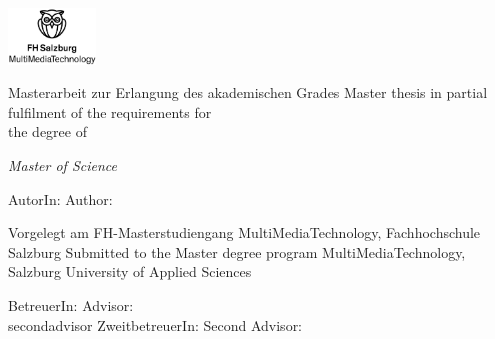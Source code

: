 \begin{titlepage}

\newcommand{\printsecondadvisor}[1]{%
  \ifcsname#1\endcsname%
  \ifmmtlanguagegerman ZweitbetreuerIn: \else Second Advisor: \fi \secondadvisor 
  \else%
    
  \fi%
}

\ifmmtmasterthesis

    
    
    \newpage
    
    \thispagestyle{empty}
    
    \hfill \includegraphics[height=1.5cm]{images/FHSLogo.jpg}
    
    \vspace*{2cm}
    
    \Large{
    \titlename
    
    \vspace*{1cm}
    
    \ifmmtlanguagegerman
    Masterarbeit zur Erlangung des akademischen Grades
    \else
    Master thesis in partial fulfilment of the requirements for\\ the degree of 
    \fi
    
    \vspace*{0.5cm}
    
    \textit{Master of Science}
    }
    
    
    \vspace*{1.5cm}
    {\large
    \ifmmtlanguagegerman AutorIn: \else Author: \fi \authorname
    }
    \vfill
    
    {\normalsize
    \ifmmtlanguagegerman
    Vorgelegt am FH-Masterstudiengang MultiMediaTechnology, Fachhochschule Salzburg
    \else
    Submitted to the Master degree program MultiMediaTechnology, Salzburg University of Applied Sciences
    \fi
    
    
    \vspace*{1cm}
    
    \ifmmtlanguagegerman BetreuerIn: \else Advisor: \fi
    \advisor
    \\    
    \printsecondadvisor{secondadvisor}
    
}
\end{titlepage}
